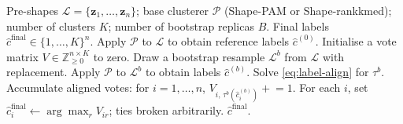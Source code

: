 \documentclass[review,11pt,3p,authoryear]{elsarticle}
\newcommand{\bz}{\mathbf{z}}
\begin{document}
\begin{algorithm}[!htbp]
\caption{BagClust1 for shape clustering \citep{dudoit2003bagging}.}
\label{alg:bagclust}
\begin{algorithmic}[1]
\Require Pre-shapes $\mathcal{L}=\{\bz_1,\ldots,\bz_n\}$; base
         clusterer $\mathcal{P}$ (Shape-PAM or Shape-rankkmed); number
         of clusters $K$; number of bootstrap replicas $B$.
\Ensure  Final labels $\hat c^{\text{final}}\in\{1,\ldots,K\}^n$.
\State Apply $\mathcal{P}$ to $\mathcal{L}$ to obtain reference labels
       $\hat c^{(0)}$.
\State Initialise a vote matrix $V\in\mathbb{Z}_{\ge 0}^{n\times K}$
       to zero.
  \State Draw a bootstrap resample $\mathcal{L}^b$ from $\mathcal{L}$
         with replacement.
  \State Apply $\mathcal{P}$ to $\mathcal{L}^b$ to obtain labels
         $\hat c^{(b)}$.
  \State Solve \eqref{eq:label-align} for $\tau^b$.
  \State Accumulate aligned votes: for $i=1,\ldots,n$,
         $V_{i,\,\tau^b(\hat c^{(b)}_i)} \mathrel{+}= 1$.
\EndFor
\State For each $i$, set
       $\hat c^{\text{final}}_i\gets\arg\max_{r}V_{ir}$; ties broken
       arbitrarily.
\State \Return $\hat c^{\text{final}}$.
\end{algorithmic}
\end{algorithm}
\end{document}

